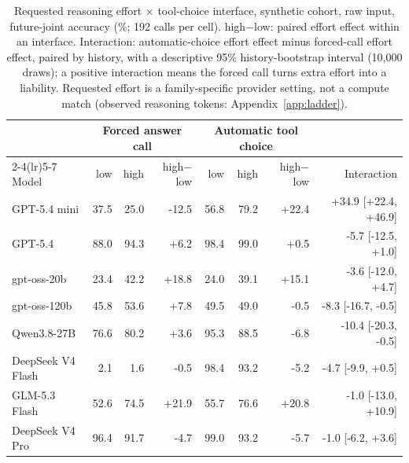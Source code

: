 \begin{table}[t]
\centering\footnotesize
\setlength{\tabcolsep}{3.5pt}
\begin{tabular}{lrrrrrrr}
\toprule
 & \multicolumn{3}{c}{Forced answer call} & \multicolumn{3}{c}{Automatic tool choice} & \\
\cmidrule(lr){2-4}\cmidrule(lr){5-7}
Model & low & high & high$-$low & low & high & high$-$low & Interaction \\
\midrule
GPT-5.4 mini & 37.5 & 25.0 & -12.5 & 56.8 & 79.2 & +22.4 & +34.9 [+22.4, +46.9] \\
GPT-5.4 & 88.0 & 94.3 & +6.2 & 98.4 & 99.0 & +0.5 & -5.7 [-12.5, +1.0] \\
gpt-oss-20b & 23.4 & 42.2 & +18.8 & 24.0 & 39.1 & +15.1 & -3.6 [-12.0, +4.7] \\
gpt-oss-120b & 45.8 & 53.6 & +7.8 & 49.5 & 49.0 & -0.5 & -8.3 [-16.7, -0.5] \\
Qwen3.8-27B & 76.6 & 80.2 & +3.6 & 95.3 & 88.5 & -6.8 & -10.4 [-20.3, -0.5] \\
DeepSeek V4 Flash & 2.1 & 1.6 & -0.5 & 98.4 & 93.2 & -5.2 & -4.7 [-9.9, +0.5] \\
GLM-5.3 Flash & 52.6 & 74.5 & +21.9 & 55.7 & 76.6 & +20.8 & -1.0 [-13.0, +10.9] \\
DeepSeek V4 Pro & 96.4 & 91.7 & -4.7 & 99.0 & 93.2 & -5.7 & -1.0 [-6.2, +3.6] \\
\bottomrule
\end{tabular}
\caption{Requested reasoning effort $\times$ tool-choice interface, synthetic cohort, raw input, future-joint accuracy (\%; 192 calls per cell). high$-$low: paired effort effect within an interface. Interaction: automatic-choice effort effect minus forced-call effort effect, paired by history, with a descriptive 95\% history-bootstrap interval (10,000 draws); a positive interaction means the forced call turns extra effort into a liability. Requested effort is a family-specific provider setting, not a compute match (observed reasoning tokens: Appendix~\ref{app:ladder}).}
\label{tab:interaction_raw}
\end{table}
